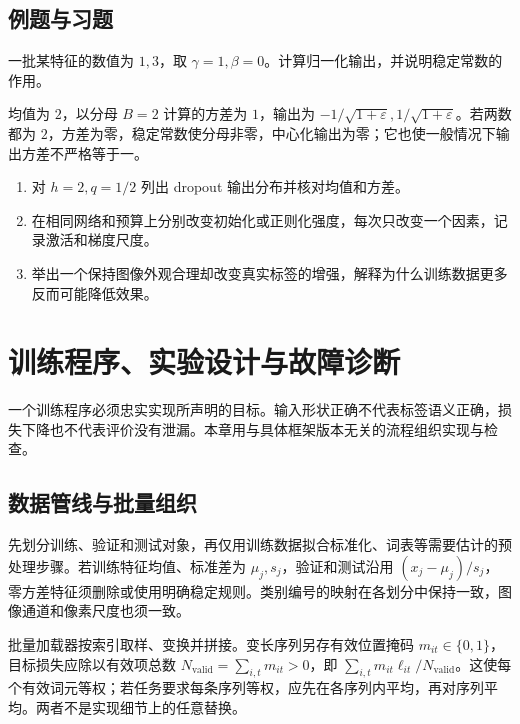 \documentclass[UTF8,12pt,a4paper,fontset=fandol]{ctexbook}
\begin{document}
\section{例题与习题}
\begin{example}[归一化的具体计算]
一批某特征的数值为 $1,3$，取 $\gamma=1,\beta=0$。计算归一化输出，并说明稳定常数的作用。
\end{example}
\begin{solve}
均值为 $2$，以分母 $B=2$ 计算的方差为 $1$，输出为 $-1/\sqrt{1+\varepsilon},1/\sqrt{1+\varepsilon}$。若两数都为 $2$，方差为零，稳定常数使分母非零，中心化输出为零；它也使一般情况下输出方差不严格等于一。
\end{solve}
\begin{enumerate}
\item 对 $h=2,q=1/2$ 列出 dropout 输出分布并核对均值和方差。
\item 在相同网络和预算上分别改变初始化或正则化强度，每次只改变一个因素，记录激活和梯度尺度。
\item 举出一个保持图像外观合理却改变真实标签的增强，解释为什么训练数据更多反而可能降低效果。
\end{enumerate}

\chapter{训练程序、实验设计与故障诊断}
\label{chap:dl-engineering}
一个训练程序必须忠实实现所声明的目标。输入形状正确不代表标签语义正确，损失下降也不代表评价没有泄漏。本章用与具体框架版本无关的流程组织实现与检查。

\section{数据管线与批量组织}
先划分训练、验证和测试对象，再仅用训练数据拟合标准化、词表等需要估计的预处理步骤。若训练特征均值、标准差为 $\mu_j,s_j$，验证和测试沿用 $(x_j-\mu_j)/s_j$，零方差特征须删除或使用明确稳定规则。类别编号的映射在各划分中保持一致，图像通道和像素尺度也须一致。

批量加载器按索引取样、变换并拼接。变长序列另存有效位置掩码 $m_{it}\in\{0,1\}$，目标损失应除以有效项总数 $N_{\mathrm{valid}}=\sum_{i,t}m_{it}>0$，即 $\sum_{i,t}m_{it}\ell_{it}/N_{\mathrm{valid}}$。这使每个有效词元等权；若任务要求每条序列等权，应先在各序列内平均，再对序列平均。两者不是实现细节上的任意替换。
\end{document}
